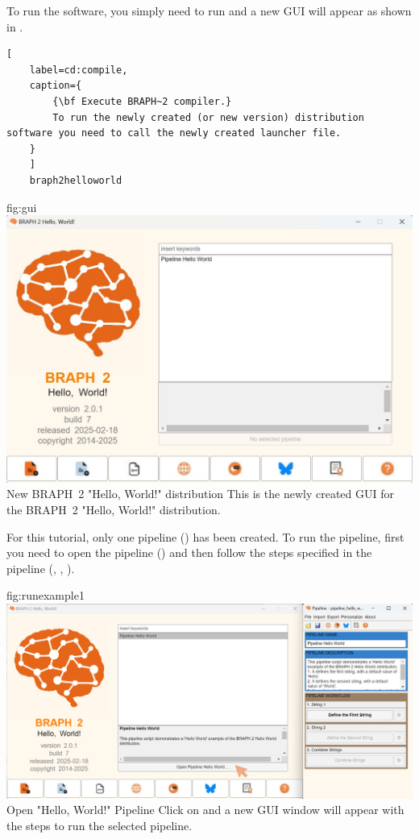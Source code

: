 \documentclass{tufte-handout}
\begin{document}
To run the software, you simply need to run  and a new GUI will appear as shown in .

\begin{lstlisting}[
	label=cd:compile,
	caption={
		{\bf Execute BRAPH~2 compiler.}
		To run the newly created (or new version) distribution software you need to call the newly created launcher file.
	}
	]
	braph2helloworld
\end{lstlisting}

	{fig:gui}
	{\includegraphics{fig03.jpg}}
	{New BRAPH~2 "Hello, World!" distribution}
	{
	This is the newly created GUI for the BRAPH~2 "Hello, World!" distribution.
	}


\clearpage

For this tutorial, only one pipeline ()  has been created. To run the pipeline, first you need to open the pipeline () and then follow the steps specified in the pipeline (, , ).

	{fig:runexample1}
	{\includegraphics{fig04.jpg}}
	{Open "Hello, World!" Pipeline}
	{
	Click on  and a new GUI window will appear with the steps to run the selected pipeline.
}
\end{document}
